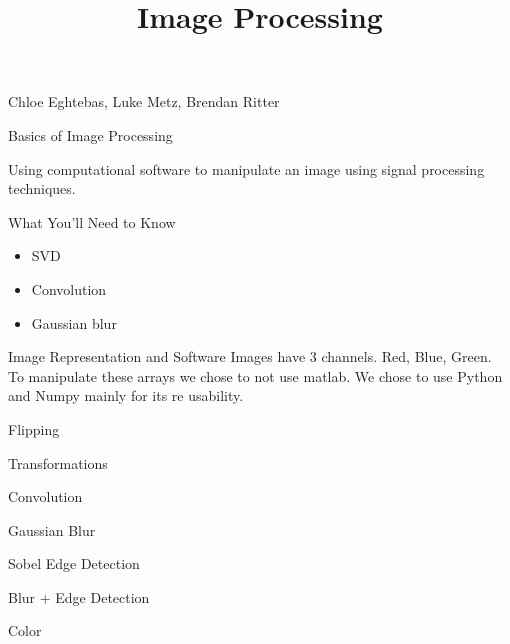\documentclass{beamer}
\begin{document}
\begin{frame}{}

\title{\textbf{Image Processing}}
\maketitle

Chloe Eghtebas, Luke Metz, Brendan Ritter

\end{frame}


\begin{frame}{Basics of Image Processing}

Using computational software to manipulate an image using signal processing techniques.

\end{frame}



\begin{frame}{What You'll Need to Know}

\begin{itemize}
	\item SVD
	\item Convolution
	\item Gaussian blur
\end{itemize}
\end{frame}

\begin{frame}{Image Representation and Software}
Images have 3 channels. Red, Blue, Green. To manipulate these arrays we chose to not use matlab. We chose to use Python and Numpy mainly for its re usability.
\end{frame} 


\begin{frame}{Flipping}

\end{frame}


\begin{frame}{Transformations}

\end{frame}

\begin{frame}{Convolution}
\end{frame}

\begin{frame}{Gaussian Blur}

\end{frame}

\begin{frame}{Sobel Edge Detection}

\end {frame}

\begin{frame}{Blur + Edge Detection}

\end{frame}


\begin{frame}{Color}

\end{frame}
\end{document}
